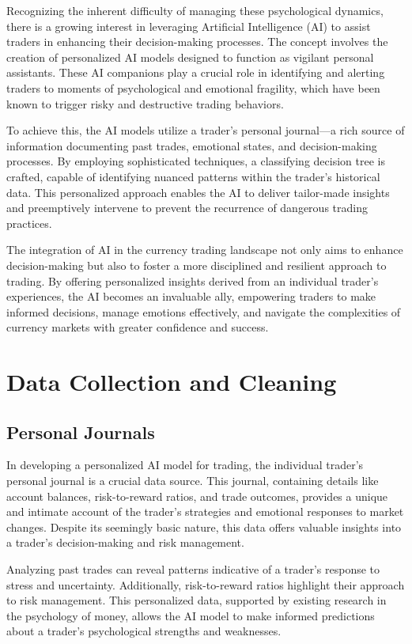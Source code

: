 \documentclass{article}
\begin{document}
Recognizing the inherent difficulty of managing these psychological dynamics, there is a growing interest in leveraging Artificial Intelligence (AI) to assist traders in enhancing their decision-making processes. The concept involves the creation of personalized AI models designed to function as vigilant personal assistants. These AI companions play a crucial role in identifying and alerting traders to moments of psychological and emotional fragility, which have been known to trigger risky and destructive trading behaviors.

To achieve this, the AI models utilize a trader's personal journal—a rich source of information documenting past trades, emotional states, and decision-making processes. By employing sophisticated techniques, a classifying decision tree is crafted, capable of identifying nuanced patterns within the trader's historical data. This personalized approach enables the AI to deliver tailor-made insights and preemptively intervene to prevent the recurrence of dangerous trading practices.

The integration of AI in the currency trading landscape not only aims to enhance decision-making but also to foster a more disciplined and resilient approach to trading. By offering personalized insights derived from an individual trader's experiences, the AI becomes an invaluable ally, empowering traders to make informed decisions, manage emotions effectively, and navigate the complexities of currency markets with greater confidence and success.



\section{Data Collection and Cleaning}
\subsection{Personal Journals}
In developing a personalized AI model for trading, the individual trader's personal journal is a crucial data source. This journal, containing details like account balances, risk-to-reward ratios, and trade outcomes, provides a unique and intimate account of the trader's strategies and emotional responses to market changes. Despite its seemingly basic nature, this data offers valuable insights into a trader's decision-making and risk management.

Analyzing past trades can reveal patterns indicative of a trader's response to stress and uncertainty. Additionally, risk-to-reward ratios highlight their approach to risk management. This personalized data, supported by existing research in the psychology of money, allows the AI model to make informed predictions about a trader's psychological strengths and weaknesses.
\end{document}
